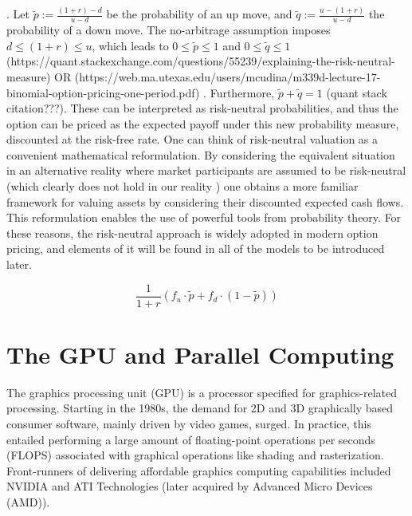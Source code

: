 \documentclass[english,12pt,a4paper,pdftex,sci,utf8]{aaltothesis}
\begin{document}
. Let $\tilde p := \frac{(1+r)-d}{u-d}$ be the probability of an up move, and  $\tilde q := \frac{u-(1+r)}{u-d}$ the probability of a down move. The no-arbitrage assumption imposes $d \leq (1+r) \leq u$, which leads to $0 \leq \tilde p \leq 1$ and  $0 \leq \tilde q \leq 1$ (https://quant.stackexchange.com/questions/55239/explaining-the-risk-neutral-measure) OR (https://web.ma.utexas.edu/users/mcudina/m339d-lecture-17-binomial-option-pricing-one-period.pdf)
. Furthermore, $\tilde p + \tilde q = 1$ (quant stack citation???). These can be interpreted as risk-neutral probabilities, and thus the option can be priced as the expected payoff under this new probability measure, discounted at the risk-free rate. One can think of risk-neutral valuation as a convenient mathematical reformulation. By considering the equivalent situation in an alternative reality where market participants are assumed to be risk-neutral (which clearly does not hold in our reality \cite{kahneman2013prospect}) one obtains a more familiar framework for valuing assets by considering their discounted expected cash flows. This reformulation enables the use of powerful tools from probability theory. For these reasons, the risk-neutral approach is widely adopted in modern option pricing, and elements of it will be found in all of the models to be introduced later. \cite{gisiger2010risk} \cite{tham2001risk}

\begin{equation}
     \frac{1}{1+r}(f_u\cdot \tilde p + f_d \cdot (1-\tilde p))
\label{risk-neutral-expectancy}
\end{equation}




\section{The GPU and Parallel Computing} \label{sec:gpu-computing}
The graphics processing unit (GPU) is a processor specified for graphics-related processing. Starting in the 1980s, the demand for 2D and 3D graphically based consumer software, mainly driven by video games, surged. In practice, this entailed performing a large amount of floating-point operations per seconds (FLOPS) associated with graphical operations like shading and rasterization. Front-runners of delivering affordable graphics computing capabilities included NVIDIA and ATI Technologies (later acquired by Advanced Micro Devices (AMD)).\cite{sanders2010cuda} \cite{kirk2016programming}
\end{document}
